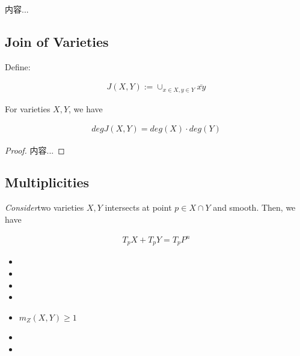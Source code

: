 \documentclass[Total.tex]{subfiles}
\begin{document}
				\begin{Def}
					内容...
				\end{Def}
				
				\subsection{Join of Varieties}
				
				\begin{Def}
					Define:
					
					\begin{gather*}
						J(X,Y):=\cup_{x\in X,y\in Y} \bar{xy}
					\end{gather*}
				\end{Def}
				
				\begin{lemma}
					For varieties $X,Y$, we have
					
					\begin{gather*}
						degJ(X,Y)=deg(X)\cdot deg(Y)
					\end{gather*}
				\end{lemma}
				
				\begin{proof}
					内容...
				\end{proof}
				
				\subsection{Multiplicities}
					
					{\Large\itshape Consider}\quad  two varieties $X,Y$ intersects at point $p\in X\cap Y$ and smooth. Then, we have
					
					\begin{gather*}
						T_pX+T_pY=T_p P^n
					\end{gather*}
					
					\begin{Def}
						\begin{itemize}
							\item 
							\item 
							\item 
							\item  
						\end{itemize}
					\end{Def}
					
					\begin{itemize}
						\item $m_Z(X,Y)\geq 1$
						\item 
						\item 
					\end{itemize}
					
\end{document}
